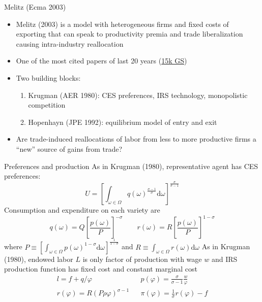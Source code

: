 \documentclass[10pt,notes=hide]{beamer}
\begin{document}
\begin{frame}{Melitz (Ecma 2003)}
\begin{itemize}
\item Melitz (2003) is a model with heterogeneous firms and fixed costs of exporting that can speak to productivity premia and trade liberalization causing intra-industry reallocation
\item One of the most cited papers of last 20 years (\href{https://scholar.google.com/citations?user=SqlfKBsAAAAJ&hl=en&oi=ao}{15k GS})
\item Two building blocks:
\begin{enumerate}
	\item Krugman (AER 1980): CES preferences, IRS technology, monopolistic competition
	\item Hopenhayn (JPE 1992): equilibrium model of entry and exit
\end{enumerate}
\item Are trade-induced reallocations of labor from less to more productive firms a ``new'' source of gains from trade?
\end{itemize}
\end{frame}
\begin{frame}{Preferences and production}
As in Krugman (1980), representative agent has CES preferences:
$$ U = \left[\int_{\omega\in\Omega} q(\omega)^{\frac{\sigma-1}{\sigma}} \textrm{d} \omega \right]^{\frac{\sigma}{\sigma-1}} $$
Consumption and expenditure on each variety are
$$
q(\omega) = Q \left[\frac{p(\omega)}{P}\right]^{-\sigma}
\qquad
r(\omega) = R \left[\frac{p(\omega)}{P}\right]^{1-\sigma}
$$
where $P\equiv \left[\int_{\omega\in\Omega} p(\omega)^{1-\sigma} \textrm{d} \omega \right]^{\frac{1}{1-\sigma}}$
and $R\equiv \int_{\omega\in\Omega} r(\omega) \textrm{d} \omega$
\medskip
As in Krugman (1980), endowed labor $L$ is only factor of production with wage $w$ and IRS production function has fixed cost and constant marginal cost
\begin{align*}
l = f + q/\varphi 
&& 
p(\varphi) = \frac{\sigma}{\sigma-1}\frac{w}{\varphi}
\\
r(\varphi) = R \left(P\rho\varphi\right)^{\sigma-1} 
&&
\pi(\varphi) = \frac{1}{\sigma} r(\varphi) - f
\end{align*}
\end{frame}
\end{document}
